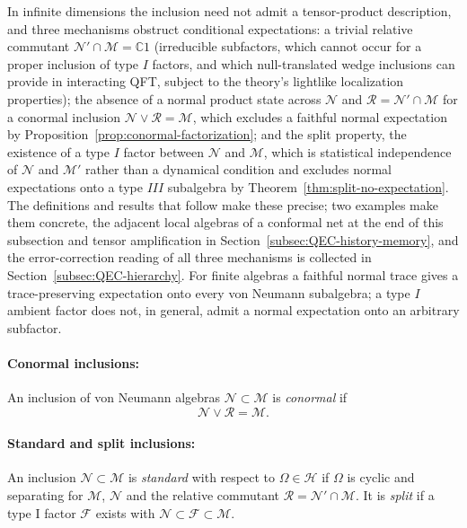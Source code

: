 \documentclass[a4paper,11pt]{article}
\theoremstyle{definition}
\begin{document}
In infinite dimensions the inclusion need not admit a tensor-product description, and three mechanisms obstruct conditional expectations: a trivial relative commutant $\mathcal N'\cap\mathcal M=\mathbb C1$ (irreducible subfactors, which cannot occur for a proper inclusion of type $I$ factors, and which null-translated wedge inclusions can provide in interacting QFT, subject to the theory's lightlike localization properties); the absence of a normal product state across $\mathcal N$ and $\mathcal R=\mathcal N'\cap\mathcal M$ for a conormal inclusion $\mathcal N\vee\mathcal R=\mathcal M$, which excludes a faithful normal expectation by Proposition~\ref{prop:conormal-factorization}; and the split property, the existence of a type $I$ factor between $\mathcal N$ and $\mathcal M$, which is statistical independence of $\mathcal N$ and $\mathcal M'$ rather than a dynamical condition and excludes normal expectations onto a type $III$ subalgebra by Theorem~\ref{thm:split-no-expectation}. The definitions and results that follow make these precise; two examples make them concrete, the adjacent local algebras of a conformal net at the end of this subsection and tensor amplification in Section~\ref{subsec:QEC-history-memory}, and the error-correction reading of all three mechanisms is collected in Section~\ref{subsec:QEC-hierarchy}. For finite algebras a faithful normal trace gives a trace-preserving expectation onto every von Neumann subalgebra; a type $I$ ambient factor does not, in general, admit a normal expectation onto an arbitrary subfactor.

\paragraph{Conormal inclusions:} An inclusion of von Neumann algebras $\mathcal N\subset \mathcal M$ is \emph{conormal} if
\begin{equation}
 \mathcal N\vee\mathcal R=\mathcal M.
\end{equation}
\paragraph{Standard and split inclusions:}
An inclusion $\mathcal N\subset\mathcal M$ is
\emph{standard} with respect to $\Omega\in\mathcal H$ if $\Omega$ is cyclic
and separating for $\mathcal M$, $\mathcal N$ and the relative commutant $\mathcal R=\mathcal N'\cap \mathcal M$. It is \emph{split} if a type I factor $\mathcal F$ exists with
$\mathcal N\subset\mathcal F\subset\mathcal M$.
\end{document}
